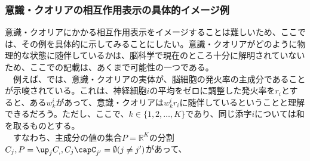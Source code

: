 \subsubsection{意識・クオリアの相互作用表示の具体的イメージ例}
意識・クオリアにかかる相互作用表示をイメージすることは難しいため、ここでは、その例を具体的に示してみることにしたい。意識・クオリアがどのように物理的な状態に随伴しているかは、脳科学で現在のところ十分に解明されていないため、ここでの記載は、あくまで可能性の一つである。\\
　例えば、\cite{Murray_2016}では、意識・クオリアの実体が、脳細胞の発火率の主成分であることが示唆されている。これは、神経細胞$i$の平均をゼロに調整した発火率を$r_i$とすると、ある$w_k^i$があって、意識・クオリアは$w_k^ir_i$に随伴しているということと理解できるだろう。ただし、ここで、$k\in\{1,2,\ldots,K\}$であり、同じ添字$i$については和を取るものとする。\\
　すなわち、主成分の値の集合$P=\mathbb{R}^K$の分割$C_j,P=\up_jC_,,C_j\capC_{j'}=\emptyset (j \neq j')$があって、